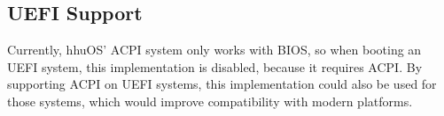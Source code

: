 \subsection{UEFI Support}
\label{subsec:uefisupport}

Currently, hhuOS' ACPI system only works with BIOS, so when booting an UEFI system, this
implementation is disabled, because it requires ACPI. By supporting ACPI on UEFI systems, this
implementation could also be used for those systems, which would improve compatibility with modern
platforms.